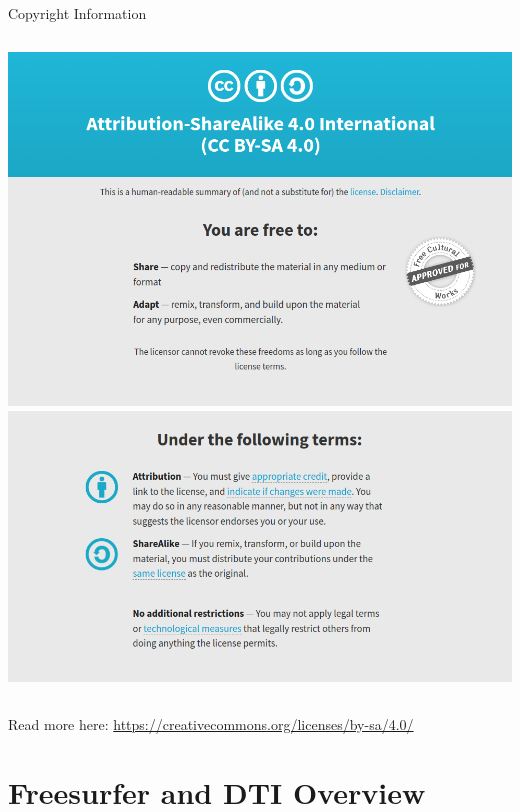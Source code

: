 \documentclass[aspectratio=169,xcolor=dvipsnames]{beamer}
\begin{document}
\begin{frame}{Copyright Information}

\begin{columns}[c]
\includegraphics[width=1\textwidth]{imgs/cc}
\includegraphics[width=1\textwidth]{imgs/cc2}
\end{columns}

\vspace{.5cm}
Read more here: \url{https://creativecommons.org/licenses/by-sa/4.0/}

\end{frame}

\section{Freesurfer and DTI Overview}
\end{document}
